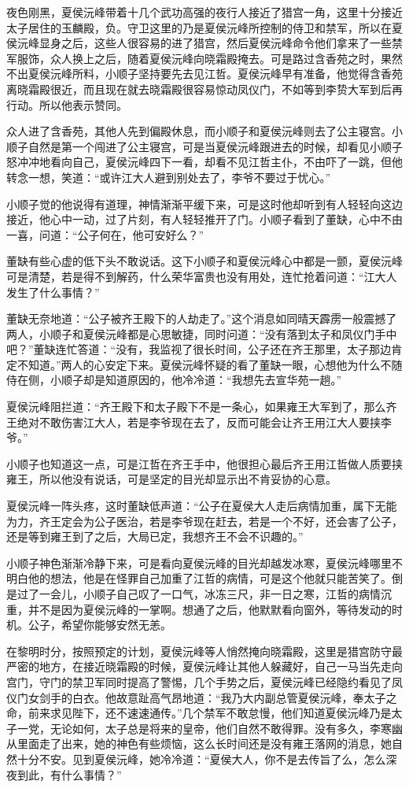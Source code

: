 夜色刚黑，夏侯沅峰带着十几个武功高强的夜行人接近了猎宫一角，这里十分接近太子居住的玉麟殿，负。守卫这里的乃是夏侯沅峰所控制的侍卫和禁军，所以在夏侯沅峰显身之后，这些人很容易的进了猎宫，然后夏侯沅峰命令他们拿来了一些禁军服饰，众人换上之后，随着夏侯沅峰向晓霜殿掩去。可是路过含香苑之时，果然不出夏侯沅峰所料，小顺子坚持要先去见江哲。夏侯沅峰早有准备，他觉得含香苑离晓霜殿很近，而且现在就去晓霜殿很容易惊动凤仪门，不如等到李贽大军到后再行动。所以他表示赞同。

众人进了含香苑，其他人先到偏殿休息，而小顺子和夏侯沅峰则去了公主寝宫。小顺子自然是第一个闯进了公主寝宫，可是当夏侯沅峰跟进去的时候，却看见小顺子怒冲冲地看向自己，夏侯沅峰四下一看，却看不见江哲主仆，不由吓了一跳，但他转念一想，笑道：“或许江大人避到别处去了，李爷不要过于忧心。”

小顺子觉的他说得有道理，神情渐渐平缓下来，可是这时他却听到有人轻轻向这边接近，他心中一动，过了片刻，有人轻轻推开了门。小顺子看到了董缺，心中不由一喜，问道：“公子何在，他可安好么？”

董缺有些心虚的低下头不敢说话。这下小顺子和夏侯沅峰心中都是一颤，夏侯沅峰可是清楚，若是得不到解药，什么荣华富贵也没有用处，连忙抢着问道：“江大人发生了什么事情？”

董缺无奈地道：“公子被齐王殿下的人劫走了。”这个消息如同晴天霹雳一般震撼了两人，小顺子和夏侯沅峰都是心思敏捷，同时问道：“没有落到太子和凤仪门手中吧？”董缺连忙答道：“没有，我监视了很长时间，公子还在齐王那里，太子那边肯定不知道。”两人的心安定下来。夏侯沅峰怀疑的看了董缺一眼，心想他为什么不随侍在侧，小顺子却是知道原因的，他冷冷道：“我想先去宣华苑一趟。”

夏侯沅峰阻拦道：“齐王殿下和太子殿下不是一条心，如果雍王大军到了，那么齐王绝对不敢伤害江大人，若是李爷现在去了，反而可能会让齐王用江大人要挟李爷。”

小顺子也知道这一点，可是江哲在齐王手中，他很担心最后齐王用江哲做人质要挟雍王，所以他没有说话，可是坚定的目光却显示出不肯妥协的心意。

夏侯沅峰一阵头疼，这时董缺低声道：“公子在夏侯大人走后病情加重，属下无能为力，齐王定会为公子医治，若是李爷现在赶去，若是一个不好，还会害了公子，还是等到雍王到了之后，大局已定，我想齐王不会不识趣的。”

小顺子神色渐渐冷静下来，可是看向夏侯沅峰的目光却越发冰寒，夏侯沅峰哪里不明白他的想法，他是在怪罪自己加重了江哲的病情，可是这个他就只能苦笑了。倒是过了一会儿，小顺子自己叹了一口气，冰冻三尺，非一日之寒，江哲的病情沉重，并不是因为夏侯沅峰的一掌啊。想通了之后，他默默看向窗外，等待发动的时机。公子，希望你能够安然无恙。

在黎明时分，按照预定的计划，夏侯沅峰等人悄然掩向晓霜殿，这里是猎宫防守最严密的地方，在接近晓霜殿的时候，夏侯沅峰让其他人躲藏好，自己一马当先走向宫门，守门的禁卫军同时提高了警惕，几个手势之后，夏侯沅峰已经隐约看见了凤仪门女剑手的白衣。他故意趾高气昂地道：“我乃大内副总管夏侯沅峰，奉太子之命，前来求见陛下，还不速速通传。”几个禁军不敢怠慢，他们知道夏侯沅峰乃是太子一党，无论如何，太子总是将来的皇帝，他们自然不敢得罪。没有多久，李寒幽从里面走了出来，她的神色有些烦恼，这么长时间还是没有雍王落网的消息，她自然十分不安。见到夏侯沅峰，她冷冷道：“夏侯大人，你不是去传旨了么，怎么深夜到此，有什么事情？”


